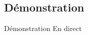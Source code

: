 \documentclass{beamer} %
\begin{document}


\subsection{Démonstration}

\begin{frame}{Démonstration}
    En direct
\end{frame}
\end{document}
